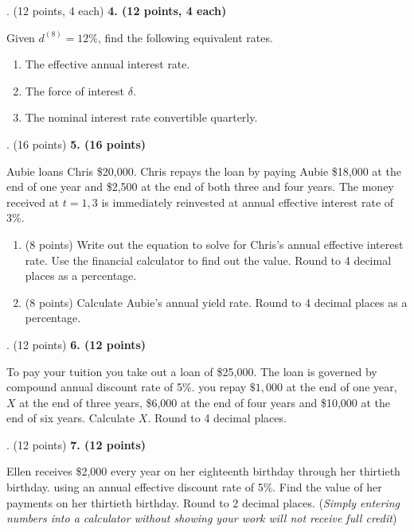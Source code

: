 \documentclass[12pt]{article}
\makeatletter
\newenvironment{problem}[1][]{%
  \bigskip%
  \noindent\begin{boxedminipage}{\columnwidth}%
  \def\@tempa{#1}%
  \ifx\@tempa\empty\else%
    \textbf{#1}\hspace{0.5em}%
  \fi%
}{%
  \end{boxedminipage}%
}
\makeatother
\begin{document}
\newpage

\newpage
\begin{problem}[4. (12 points, 4 each)]
Given $d^{(8)} = 12\%$, find the following equivalent rates.


\begin{enumerate}
\itemsep = .01em
    \item[(a)] The effective annual interest rate. 
    \item[(b)] The force of interest $\delta$.
    \item[(c)] The nominal interest rate convertible quarterly.
\end{enumerate} 
\end{problem}

\newpage

\newpage
\begin{problem}[5. (16 points)]
Aubie loans Chris \$20,000. Chris repays the loan by paying Aubie \$18,000 at the end of one year and \$2,500 at the end of both three and four years. The money received at $t=1,3$ is immediately reinvested at annual effective interest rate of 3\%.
    \begin{enumerate}[label=(\alph*)]
        \item (8 points) Write out the equation to solve for Chris’s annual effective interest rate. Use the financial calculator to find out the value. Round to 4 decimal places as a percentage.
        \item (8 points) Calculate Aubie's annual yield rate. Round to 4 decimal places as a percentage.
    \end{enumerate}
\end{problem}

\newpage

\newpage
\begin{problem}[6. (12 points)]
To pay your tuition you take out a loan of \$25,000. The loan is governed by compound annual discount rate of 5\%. you repay $\$1,000$ at the end of one year, $X$ at the end of three years, \$6,000 at the end of four years and \$10,000 at the end of six years. Calculate $X$. Round to 4 decimal places.
\end{problem}

\newpage

\newpage
\begin{problem}[7. (12 points)]
Ellen receives \$2,000 every year on her eighteenth birthday through her thirtieth birthday. using an annual effective discount rate of 5\%. Find the value of her payments on her thirtieth birthday. Round to 2 decimal places. (\textit{Simply entering numbers into a calculator without showing your work will not receive full credit})
\end{problem}
\end{document}
